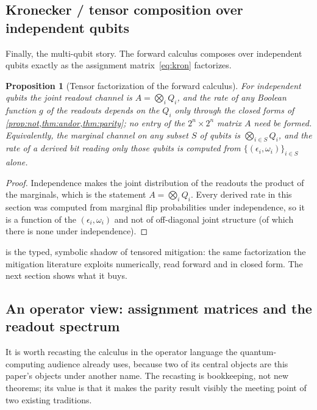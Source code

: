 \documentclass[12pt]{article}
\numberwithin{equation}{section}
\theoremstyle{plain}
\newtheorem{proposition}[theorem]{Proposition}
\theoremstyle{definition}
\theoremstyle{remark}
\newcommand{\eps}{\epsilon}
\begin{document}
\subsection{Kronecker / tensor composition over independent qubits}

Finally, the multi-qubit story. The forward calculus composes over independent
qubits exactly as the assignment matrix~\eqref{eq:kron} factorizes.

\begin{proposition}[Tensor factorization of the forward calculus]
\label{prop:tensor}
For independent qubits the joint readout channel is $A=\bigotimes_i Q_i$, and
the rate of any Boolean function $g$ of the readouts depends on the $Q_i$ only
through the closed forms of \cref{prop:not,thm:andor,thm:parity}; no entry of
the $2^n\times2^n$ matrix $A$ need be formed. Equivalently, the marginal channel
on any subset $S$ of qubits is $\bigotimes_{i\in S} Q_i$, and the rate of a
derived bit reading only those qubits is computed from $\{(\eps_i,\omega_i)\}_{i\in S}$
alone.
\end{proposition}

\begin{proof}
Independence makes the joint distribution of the readouts the product of the
marginals, which is the statement $A=\bigotimes_i Q_i$. Every derived rate in
this section was computed from marginal flip probabilities under independence, so
it is a function of the $(\eps_i,\omega_i)$ and not of off-diagonal joint
structure (of which there is none under independence).
\end{proof}

 is the typed, symbolic shadow of tensored mitigation: the same
factorization the mitigation literature exploits numerically, read forward and in
closed form. The next section shows what it buys.

\subsection{An operator view: assignment matrices and the readout spectrum}
\label{sec:operator}

It is worth recasting the calculus in the operator language the
quantum-computing audience already uses, because two of its central objects are
this paper's objects under another name. The recasting is bookkeeping, not new
theorems; its value is that it makes the parity result visibly the meeting point
of two existing traditions.
\end{document}
